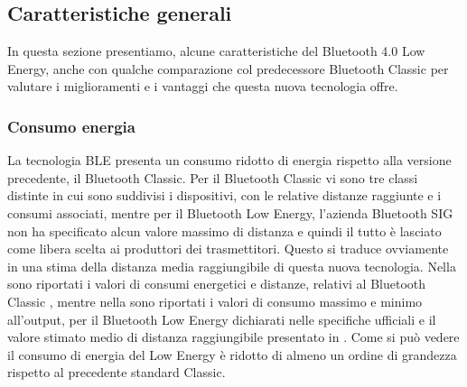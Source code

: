 \subsection{Caratteristiche generali}

In questa sezione presentiamo, alcune caratteristiche del Bluetooth 4.0 Low Energy, anche con qualche comparazione col predecessore Bluetooth Classic per valutare i miglioramenti e i vantaggi che questa nuova tecnologia offre.

\subsubsection{Consumo energia}
La tecnologia \acf{BLE} presenta un consumo ridotto di energia rispetto alla versione precedente, il Bluetooth Classic. Per il Bluetooth Classic vi sono tre classi distinte in cui sono suddivisi i dispositivi, con le relative distanze raggiunte e i consumi associati, mentre per il Bluetooth Low Energy, l'azienda Bluetooth SIG non ha specificato alcun valore massimo di distanza e quindi il tutto è lasciato come libera scelta ai produttori dei trasmettitori. Questo si traduce ovviamente in una stima della distanza media raggiungibile di questa nuova tecnologia. Nella  sono riportati i valori di consumi energetici e distanze, relativi al Bluetooth Classic \cite{BT-Basics}, mentre nella  sono riportati i valori di consumo massimo e minimo all'output, per il Bluetooth Low Energy dichiarati nelle specifiche ufficiali \cite{BT-CoreSpec4.0} e il valore stimato medio di distanza raggiungibile presentato in \cite{tesi_tibertoa2013}. Come si può vedere il consumo di energia del Low Energy è ridotto di almeno un ordine di grandezza rispetto al precedente standard Classic.

